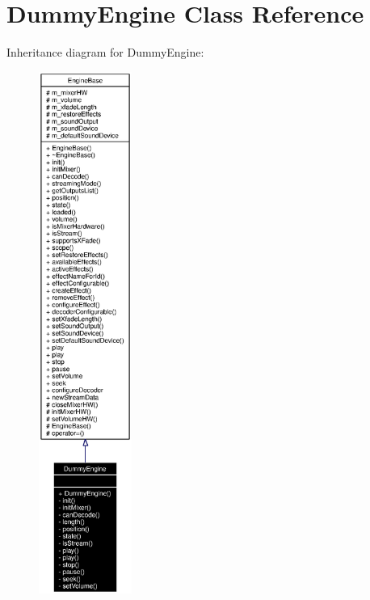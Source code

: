 \section{Dummy\-Engine Class Reference}
\label{classDummyEngine}
Inheritance diagram for Dummy\-Engine:\begin{figure}[H]
\begin{center}
\leavevmode
\includegraphics[width=86pt]{classDummyEngine__inherit__graph}
\end{center}
\end{figure}
